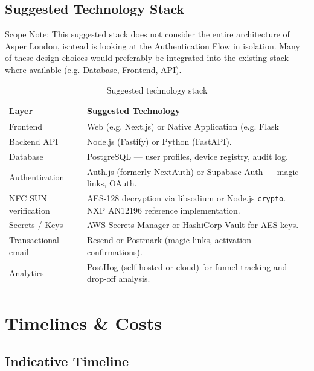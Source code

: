 \documentclass[
	a4paper, %
]{ChaosEngineReport}
\begin{document}
\subsection{Suggested Technology Stack}

\begin{callout_box}{Scope Note:}
This suggested stack does not consider the entire architecture of Asper London, isntead is looking at the Authentication Flow in isolation. Many of these design choices would preferably be integrated into the existing stack where available (e.g. Database, Frontend, API).
\end{callout_box}

\begin{table}[h!]
\centering
\small
{}
\begin{tabularx}{\linewidth}{@{} L{3.2cm} X @{}}
  \toprule
  \textbf{Layer} &
  \textbf{Suggested Technology} \\
  \midrule
  Frontend & Web (e.g. Next.js) or Native Application (e.g. Flask \\
  Backend API & Node.js (Fastify) or Python (FastAPI). \\
  Database & PostgreSQL — user profiles, device registry, audit log. \\
  Authentication & Auth.js (formerly NextAuth) or Supabase Auth — magic links, OAuth. \\
  NFC SUN verification & AES-128 decryption via libsodium or Node.js \texttt{crypto}. NXP AN12196 reference implementation. \\
  Secrets / Keys & AWS Secrets Manager or HashiCorp Vault for AES keys. \\
  Transactional email & Resend or Postmark (magic links, activation confirmations). \\
  Analytics & PostHog (self-hosted or cloud) for funnel tracking and drop-off analysis. \\
\end{tabularx}
\caption{Suggested technology stack}
\end{table}

\newpage

\section{Timelines \& Costs}

\subsection{Indicative Timeline}
\end{document}
